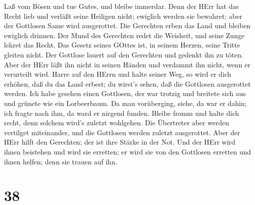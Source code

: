  Laß vom Bösen und tue Gutes, und bleibe immerdar.
 Denn der HErr hat das Recht lieb und verläßt seine
Heiligen nicht; ewiglich werden sie bewahret; aber der Gottlosen Same
wird ausgerottet.  Die Gerechten erben das Land und bleiben
ewiglich drinnen.  Der Mund des Gerechten redet die
Weisheit, und seine Zunge lehret das Recht.  Das Gesetz
seines GOttes ist, in seinem Herzen, seine Tritte gleiten nicht.
 Der Gottlose lauert auf den Gerechten und gedenkt ihn zu
töten.  Aber der HErr läßt ihn nicht in seinen Händen und
verdammt ihn nicht, wenn er verurteilt wird.  Harre auf den
HErrn und halte seiner Weg, so wird er dich erhöhen, daß du das Land
erbest; du wirst's sehen, daß die Gottlosen ausgerottet werden.
 Ich habe gesehen einen Gottlosen, der war trotzig und
breitete sich aus und grünete wie ein Lorbeerbaum.  Da man
vorüberging, siehe, da war er dahin; ich fragte nach ihm, da ward er
nirgend funden.  Bleibe fromm und halte dich recht, denn
solchem wird's zuletzt wohlgehen.  Die Übertreter aber
werden vertilget miteinander, und die Gottlosen werden zuletzt
ausgerottet.  Aber der HErr hilft den Gerechten; der ist
ihre Stärke in der Not.  Und der HErr wird ihnen beistehen
und wird sie erretten; er wird sie von den Gottlosen erretten und ihnen
helfen; denn sie trauen auf ihn.

\hypertarget{section-37}{%
\section{38}\label{section-37}}


